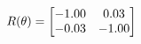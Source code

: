 \documentclass[preview]{standalone}
\begin{document}
\begin{align*}
\special{dvisvgm:raw <g id='unique000'>}R(\theta) = \begin{bmatrix}-1.00 & 0.03\\-0.03 & -1.00\end{bmatrix}\special{dvisvgm:raw </g>}
\end{align*}
\end{document}
